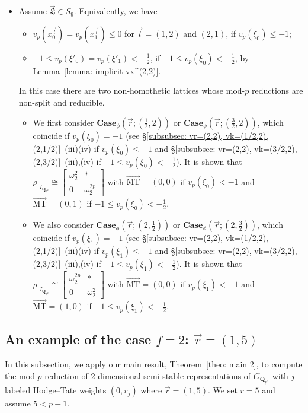 \documentclass[11pt]{amsart}
\theoremstyle{definition}
\numberwithin{equation}{subsection}
\theoremstyle{plain}
\theoremstyle{plain}
\theoremstyle{plain}
\theoremstyle{plain}
\theoremstyle{plain}
\theoremstyle{plain}
\theoremstyle{plain}
\theoremstyle{plain}
\theoremstyle{plain}
\theoremstyle{plain}
\theoremstyle{plain}
\theoremstyle{plain}
\theoremstyle{definition}
\theoremstyle{definition}
\theoremstyle{definition}
\theoremstyle{remark}
\renewcommand{\(}{\textup{(}}
\renewcommand{\)}{\textup{)}}
\newcommand{\Q}{\mathbf{Q}}
\newcommand{\rhobar}{\overline{\rho}}
\newcommand{\fL}{\mathfrak{L}}
\newcommand{\vr}{\vec{r}}
\newcommand{\vl}{\vec{l}}
\newcommand{\vL}{\vec{\fL}}
\newcommand{\IQptwo}{{I_{\Q_{p^2}}}}
\begin{document}
\begin{itemize}[leftmargin=*]
\item Assume $\vL\in S_9$. Equivalently, we have
\begin{itemize}[leftmargin=*]
    \item $v_p(x_0^{\vl})=v_p(x_1^{\vl})\leq 0$ for $\vl=(1,2)$ and $(2,1)$, if $v_p(\xi_0)\leq -1$;
    \item $-1\leq v_p(\xi'_0)=v_p(\xi'_1)<-\frac{1}{2}$, if $-1\leq v_p(\xi_0)<-\frac{1}{2}$, by Lemma~\ref{lemma: implicit vx^(2,2)}.
\end{itemize}
In this case there are two non-homothetic lattices whose mod-$p$ reductions are non-split and reducible.
    \begin{itemize}[leftmargin=*]
    \item We first consider $\mathbf{Case}_\phi(\vr;(\frac{1}{2},2))$ or $\mathbf{Case}_\phi(\vr;(\frac{3}{2},2))$, which coincide if $v_p(\xi_0)=-1$ (see \S\ref{subsubsec: vr=(2,2), vk=(1/2,2),(2,1/2)}~(iii)(iv) if $v_p(\xi_0)\leq -1$ and \S\ref{subsubsec: vr=(2,2), vk=(3/2,2),(2,3/2)}~(iii),(iv) if $-1\leq v_p(\xi_0)<-\frac{1}{2}$). It is shown that $\rhobar|_\IQptwo\cong
    \begin{bmatrix}
        \omega_2^2 & * \\ 0 & \omega_2^{2p}
    \end{bmatrix}$ with $\vec{\mathrm{MT}}=(0,0)$ if $v_p(\xi_0)<-1$ and $\vec{\mathrm{MT}}=(0,1)$ if $-1\leq v_p(\xi_0)<-\frac{1}{2}$.
    \item We also consider $\mathbf{Case}_\phi(\vr;(2,\frac{1}{2}))$ or $\mathbf{Case}_\phi(\vr;(2,\frac{3}{2}))$, which coincide if $v_p(\xi_1)=-1$ (see \S\ref{subsubsec: vr=(2,2), vk=(1/2,2),(2,1/2)}~(iii)(iv) if $v_p(\xi_1)\leq -1$ and \S\ref{subsubsec: vr=(2,2), vk=(3/2,2),(2,3/2)}~(iii),(iv) if $-1\leq v_p(\xi_1)<-\frac{1}{2}$). It is shown that $\rhobar|_\IQptwo\cong
    \begin{bmatrix}
        \omega_2^{2p} & * \\ 0 & \omega_2^2
    \end{bmatrix}$ with $\vec{\mathrm{MT}}=(0,0)$ if $v_p(\xi_1)<-1$ and $\vec{\mathrm{MT}}=(1,0)$ if $-1\leq v_p(\xi_1)<-\frac{1}{2}$.
    \end{itemize}
\end{itemize}

\subsection{An example of the case $f=2$: $\vr=(1,5)$}
In this subsection, we apply our main result, Theorem~\ref{theo: main 2}, to compute the mod-$p$ reduction of $2$-dimensional semi-stable representations of $G_{\Q_{p^2}}$ with $j$-labeled Hodge--Tate weights $(0,r_j)$ where $\vr=(1,5)$. We set $r=5$ and assume $5<p-1$.
\end{document}
